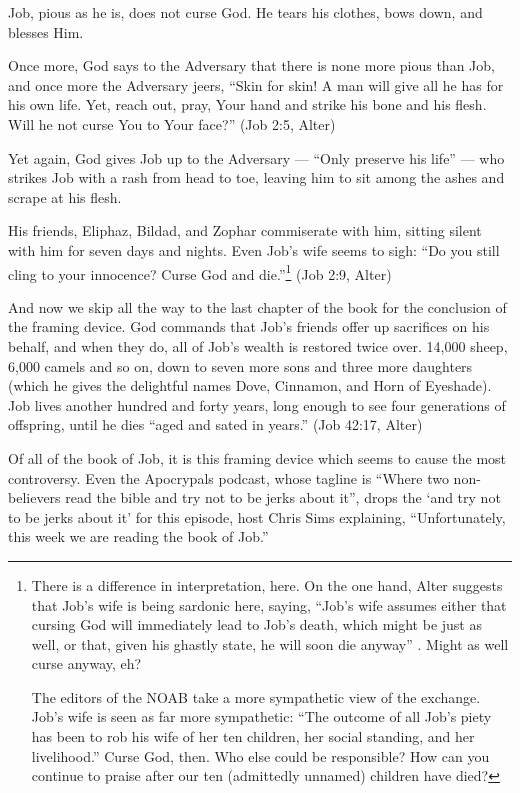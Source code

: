 Job, pious as he is, does not curse God. He tears his clothes, bows down, and blesses Him.

Once more, God says to the Adversary that there is none more pious than Job, and once more the Adversary jeers, ``Skin for skin! A man will give all he has for his own life. Yet, reach out, pray, Your hand and strike his bone and his flesh. Will he not curse You to Your face?'' (Job 2:5, Alter)

Yet again, God gives Job up to the Adversary --- ``Only preserve his life'' --- who strikes Job with a rash from head to toe, leaving him to sit among the ashes and scrape at his flesh.

His friends, Eliphaz, Bildad, and Zophar commiserate with him, sitting silent with him for seven days and nights. Even Job's wife seems to sigh: ``Do you still cling to your innocence? Curse God and die.''\footnote{There is a difference in interpretation, here. On the one hand, Alter suggests that Job's wife is being sardonic here, saying, ``Job's wife assumes either that cursing God will immediately lead to Job's death, which might be just as well, or that, given his ghastly state, he will soon die anyway'' \parencite[469]{alter}. Might as well curse anyway, eh?

  The editors of the NOAB take a more sympathetic view of the exchange. Job's wife is seen as far more sympathetic: ``The outcome of all Job's piety has been to rob his wife of her ten children, her social standing, and her livelihood.'' \parencite[737]{noab} Curse God, then. Who else could be responsible? How can you continue to praise after our ten (admittedly unnamed) children have died?} (Job 2:9, Alter)

And now we skip all the way to the last chapter of the book for the conclusion of the framing device. God commands that Job's friends offer up sacrifices on his behalf, and when they do, all of Job's wealth is restored twice over. 14,000 sheep, 6,000 camels and so on, down to seven more sons and three more daughters (which he gives the delightful names Dove, Cinnamon, and Horn of Eyeshade). Job lives another hundred and forty years, long enough to see four generations of offspring, until he dies ``aged and sated in years.'' (Job 42:17, Alter)

Of all of the book of Job, it is this framing device which seems to cause the most controversy. Even the Apocrypals podcast, whose tagline is ``Where two non-believers read the bible and try not to be jerks about it'', drops the `and try not to be jerks about it' for this episode, host Chris Sims explaining, ``Unfortunately, this week we are reading the book of Job.'' \parencite{apocrypals}

